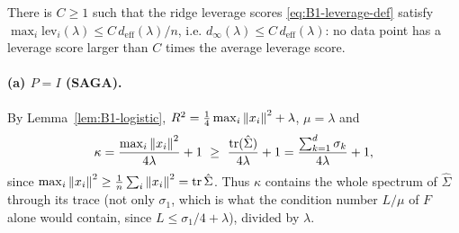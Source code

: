 \begin{assumption}\label{ass:B1-coherence}
There is $C\ge1$ such that the ridge leverage scores \eqref{eq:B1-leverage-def} satisfy
$\max_i\mathrm{lev}_i(\lambda)\le C\,d_{\mathrm{eff}}(\lambda)/n$, i.e.
$d_\infty(\lambda)\le C\,d_{\mathrm{eff}}(\lambda)$: no data point has a leverage score larger than $C$
times the average leverage score.
\end{assumption}

\paragraph{(a) $P=I$ (SAGA).}
By Lemma~\ref{lem:B1-logistic}, $R^2=\frac14\max_i\left\|x_i\right\|^2+\lambda$, $\mu=\lambda$ and
\begin{equation}\label{eq:B1-kappa-I}
\kappa=\frac{\max_i\norm{x_i}^2}{4\lambda}+1\ \ge\ \frac{\tr(\hat\Sigma)}{4\lambda}+1
=\frac{\sum_{k=1}^d\sigma_k}{4\lambda}+1 ,
\end{equation}
since $\max_i\left\|x_i\right\|^2\ge\frac1n\sum_i\left\|x_i\right\|^2=\operatorname{tr}\hat\Sigma$. Thus $\kappa$ contains the whole
spectrum of $\hat\Sigma$ through its trace (not only $\sigma_1$, which is what the condition number
$L/\mu$ of $F$ alone would contain, since $L\le\sigma_1/4+\lambda$), divided by $\lambda$.

